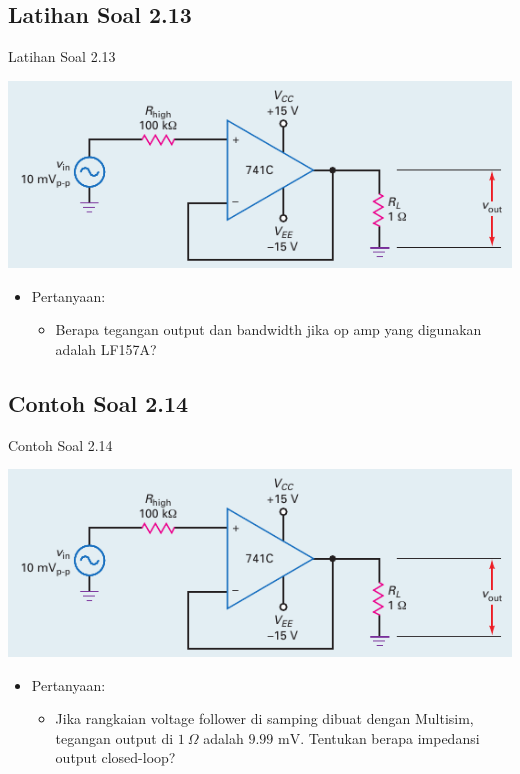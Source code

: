\subsection{Latihan Soal 2.13}
\begin{frame}{Latihan Soal 2.13}
	\begin{multicols}{2}
		\begin{center}
			\includegraphics[width=\linewidth]{gambar/fig-16.26a}
		\end{center}
		\columnbreak
		\begin{itemize}
			\item Pertanyaan:
			\begin{itemize}
				\item Berapa tegangan output dan bandwidth jika op amp yang digunakan adalah LF157A?
			\end{itemize}
		\end{itemize}
	\end{multicols}
\end{frame}

\subsection{Contoh Soal 2.14}
\begin{frame}{Contoh Soal 2.14}
	\begin{multicols}{2}
		\begin{center}
			\includegraphics[width=\linewidth]{gambar/fig-16.26a}
		\end{center}
		\columnbreak
		\begin{itemize}
			\item Pertanyaan:
			\begin{itemize}
				\item Jika rangkaian voltage follower di samping dibuat dengan Multisim, tegangan output di $ 1 ~\Omega $ adalah $ 9.99 \text{ mV} $. Tentukan berapa impedansi output closed-loop?
			\end{itemize}
		\end{itemize}
	\end{multicols}
\end{frame}

